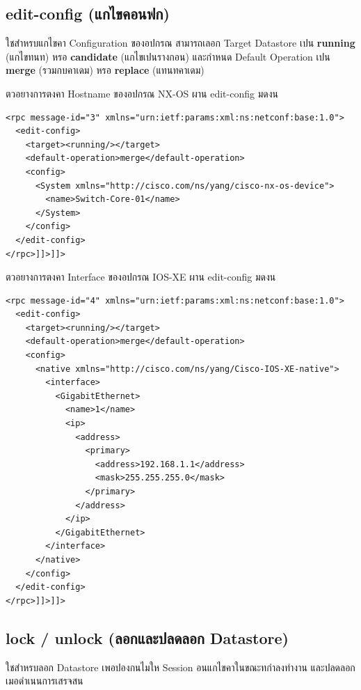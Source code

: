 \subsection{edit-config (แกไขคอนฟก)}
\hspace*{1.3em}
ใชสำหรบแกไขคา Configuration ของอปกรณ สามารถเลอก Target Datastore เปน \textbf{running} (แกไขทนท) หรอ \textbf{candidate} (แกไขเปนรางกอน) และกำหนด Default Operation เปน \textbf{merge} (รวมกบคาเดม) หรอ \textbf{replace} (แทนทคาเดม)

\hspace*{1.3em}
ตวอยางการตงคา Hostname ของอปกรณ NX-OS ผาน edit-config มดงน

{\fontsize{13}{14}\selectfont
\begin{verbatim}
<rpc message-id="3" xmlns="urn:ietf:params:xml:ns:netconf:base:1.0">
  <edit-config>
    <target><running/></target>
    <default-operation>merge</default-operation>
    <config>
      <System xmlns="http://cisco.com/ns/yang/cisco-nx-os-device">
        <name>Switch-Core-01</name>
      </System>
    </config>
  </edit-config>
</rpc>]]>]]>
\end{verbatim}
}

\hspace*{1.3em}
ตวอยางการตงคา Interface ของอปกรณ IOS-XE ผาน edit-config มดงน

{\fontsize{13}{14}\selectfont
\begin{verbatim}
<rpc message-id="4" xmlns="urn:ietf:params:xml:ns:netconf:base:1.0">
  <edit-config>
    <target><running/></target>
    <default-operation>merge</default-operation>
    <config>
      <native xmlns="http://cisco.com/ns/yang/Cisco-IOS-XE-native">
        <interface>
          <GigabitEthernet>
            <name>1</name>
            <ip>
              <address>
                <primary>
                  <address>192.168.1.1</address>
                  <mask>255.255.255.0</mask>
                </primary>
              </address>
            </ip>
          </GigabitEthernet>
        </interface>
      </native>
    </config>
  </edit-config>
</rpc>]]>]]>
\end{verbatim}
}

\subsection{lock / unlock (ลอกและปลดลอก Datastore)}
\hspace*{1.3em}
ใชสำหรบลอก Datastore เพอปองกนไมให Session อนแกไขคาในขณะทกำลงทำงาน และปลดลอกเมอดำเนนการเสรจสน

